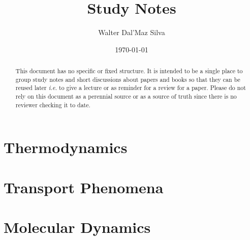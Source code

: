 \documentclass[12pt]{paper}
\title{Study Notes}
\author{Walter Dal'Maz Silva}
\date{\today}
\newcommand{\newSection}[1]{\cleardoublepage\section{#1}}
\begin{document}
\maketitle%

\begin{abstract}
	This document has no specific or fixed structure. It is intended to be a single place to group study notes and short discussions about papers and books so that they can be reused later \emph{i.e.} to give a lecture or as reminder for a review for a paper. Please do not rely on this document as a perennial source or as a source of truth since there is no reviewer checking it to date.
\end{abstract}

\cleardoublepage\tableofcontents%

\newSection{Thermodynamics}



\newSection{Transport Phenomena}


\newSection{Molecular Dynamics}

\newpage%
\printbibliography%
\end{document}
